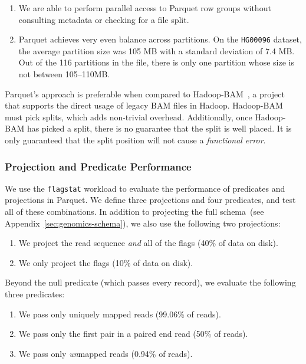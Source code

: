 \documentclass{acm_proc_article-sp}
\begin{document}
\begin{enumerate}
\item We are able to perform parallel access to Parquet row groups without consulting metadata or checking for
a file split.
\item Parquet achieves very even balance across partitions. On the \texttt{HG00096} dataset, the average
partition size was 105 MB with a standard deviation of 7.4 MB. Out of the 116 partitions in the file, there is only
one partition whose size is not between 105--110MB.
\end{enumerate}

Parquet's approach is preferable when compared to Hadoop-BAM~\cite{niemenmaa12}, a project that supports
the direct usage of legacy BAM files in Hadoop. Hadoop-BAM must pick splits, which adds non-trivial overhead.
Additionally, once Hadoop-BAM has picked a split, there is no guarantee that the split is well placed. It is only
guaranteed that the split position will not cause a \emph{functional error}.

\subsubsection{Projection and Predicate Performance}
\label{sec:projection-predicate-performance}

We use the \texttt{flagstat} workload to evaluate the performance of predicates and projections in Parquet.
We define three projections and four predicates, and test all of these combinations. In addition to projecting the
full schema~(see Appendix~\ref{sec:genomics-schema}), we also use the following two projections:

\begin{enumerate}
\item We project the read sequence \emph{and} all of the flags (40\% of data on disk).
\item We only project the flags (10\% of data on disk).
\end{enumerate}

Beyond the null predicate (which passes every record), we evaluate the following three predicates:

\begin{enumerate}
\item We pass only uniquely mapped reads (99.06\% of reads).
\item We pass only the first pair in a paired end read (50\% of reads).
\item We pass only \emph{un}mapped reads (0.94\% of reads).
\end{enumerate}
\end{document}
